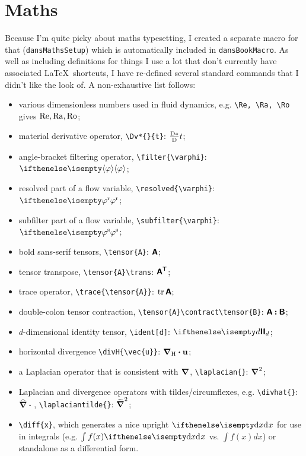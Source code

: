 \section{Maths}
Because I'm quite picky about maths typesetting, I created a separate macro for that (\texttt{dansMathsSetup}) which is automatically included in \texttt{dansBookMacro}.
As well as including definitions for things I use a lot that don't currently have associated \LaTeX\ shortcuts, I have re-defined several standard commands that I didn't like the look of. 
A non-exhaustive list follows:
\begin{itemize}
    \item various dimensionless numbers used in fluid dynamics, e.g. \verb!\Re, \Ra, \Ro! gives $\operatorname{Re}, \operatorname{Ra}, \operatorname{Ro}$; 
    \item material derivative operator, \verb!\Dv*{}{t}!: $\frac{\operatorname{D}\!{*}}{\operatorname{D}\!{}}{t}$; 
    \item angle-bracket filtering operator,  \verb!\filter{\varphi}!: $\filter{\varphi}$;
    \item resolved part of a flow variable, \verb!\resolved{\varphi}!: $\resolved{\varphi}$; 
    \item subfilter part of a flow variable, \verb!\subfilter{\varphi}!: $\subfilter{\varphi}$;
    \item bold sans-serif tensors, \verb!\tensor{A}!: $\boldsymbol{\mathsf{A}}$;
    \item tensor transpose,  \verb!\tensor{A}\trans!: $\boldsymbol{\mathsf{A}}^{\mathsf{T}}$;
    \item trace operator, \verb!\trace{\tensor{A}}!: $\trace{\tensor{A}}$;
    \item double-colon tensor contraction, \verb!\tensor{A}\contract\tensor{B}!: $\boldsymbol{\mathsf{A}}\mathbin{\boldsymbol{:}}\boldsymbol{\mathsf{B}}$; 
    \item $d$-dimensional identity tensor,  \verb!\ident[d]!: $\ident[d]$; 
    \item horizontal divergence \verb!\divH{\vec{u}}!: $\divH{\vec{u}}$;
    \item a Laplacian operator that is consistent with $\grad$, \verb!\laplacian{}!: $\grad^2{}$;
    \item Laplacian and divergence operators with tildes/circumflexes, e.g. \verb!\divhat{}!: $\divhat{}$, \verb!\laplaciantilde{}!: $\widetilde{\grad}^2{}$;
    \item \verb!\diff{x}!, which generates a nice upright $\diff{x}$ for use in integrals (e.g. $\int f(x) \diff{x}$ vs. $\int f(x) dx$) or standalone as a differential form.
\end{itemize}

